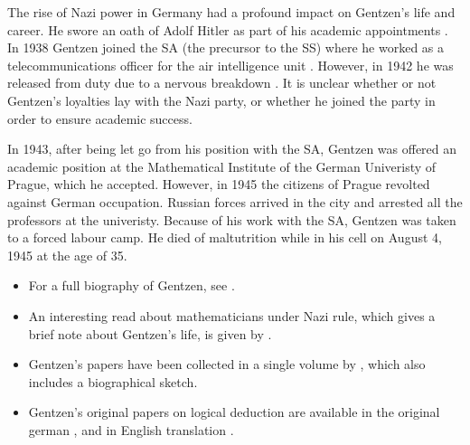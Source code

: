 \documentclass[../../../include/open-logic-section]{subfiles}
\begin{document}
The rise of Nazi power in Germany had a profound impact on Gentzen's life
and career. He swore an oath of Adolf Hitler as part
of his academic appointments \citep[119]{Menzler-Trott2007}.
In 1938 Gentzen joined the SA (the precursor to the SS) where he
worked as a telecommunications officer for the air intelligence
unit \citep[469]{Segal2014}. However, in 1942 he was released from duty due
to a nervous breakdown \citep[469]{Segal2014}. It is unclear whether or not
Gentzen's loyalties lay with the Nazi party, or whether he joined the party
 in order to ensure academic success.

In 1943, after being let go from his position with the SA, Gentzen was offered 
an academic position at the Mathematical Institute of the
German Univeristy of Prague, which he accepted. However, in 1945 the
citizens of Prague revolted against German occupation. Russian forces
arrived in the city and arrested all the professors at the univeristy.
Because of his work with the SA, Gentzen was taken to a forced labour camp. He
died of maltutrition while in his cell on August 4, 1945 at the age of 35.

\begin{reading}
\begin{itemize}
\item For a full biography of Gentzen, see \citet{Menzler-Trott2007}.

\item An interesting read about mathematicians under Nazi rule, which gives a
brief note about Gentzen's life, is given by \citet{Segal2014}.

\item Gentzen's papers have been collected in a single volume by 
\citet{Gentzen1969}, which also includes a biographical sketch.

\item Gentzen's original papers on logical deduction are available in the
original german \citep{Gentzen1935a,Gentzen1935b}, and in English 
translation \citep{Gentzen1969}.

\end{itemize}
\end{reading}
\end{document}
